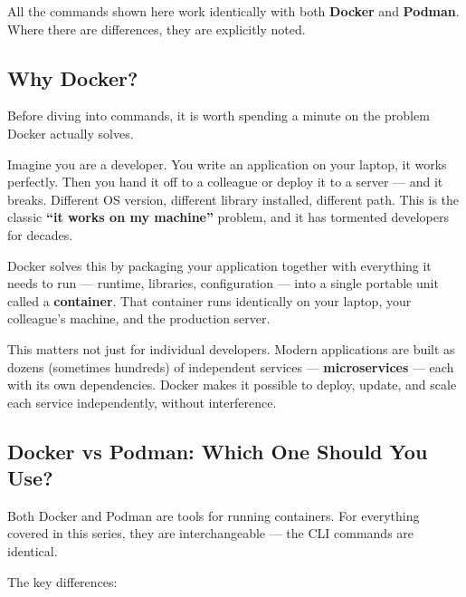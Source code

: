 \documentclass[11pt,american,a4paper,openany]{book}
\begin{document}
All the commands shown here work identically with both \textbf{Docker}
and \textbf{Podman}. Where there are differences, they are explicitly
noted.

\subsection{Why Docker?}\label{why-docker}

Before diving into commands, it is worth spending a minute on the
problem Docker actually solves.

Imagine you are a developer. You write an application on your laptop, it
works perfectly. Then you hand it off to a colleague or deploy it to a
server --- and it breaks. Different OS version, different library
installed, different path. This is the classic \textbf{``it works on my
machine''} problem, and it has tormented developers for decades.

Docker solves this by packaging your application together with
everything it needs to run --- runtime, libraries, configuration ---
into a single portable unit called a \textbf{container}. That container
runs identically on your laptop, your colleague's machine, and the
production server.

This matters not just for individual developers. Modern applications are
built as dozens (sometimes hundreds) of independent services ---
\textbf{microservices} --- each with its own dependencies. Docker makes
it possible to deploy, update, and scale each service independently,
without interference.

\subsection{Docker vs Podman: Which One Should You
Use?}\label{docker-vs-podman-which-one-should-you-use}

Both Docker and Podman are tools for running containers. For everything
covered in this series, they are interchangeable --- the CLI commands
are identical.

The key differences:
\end{document}
